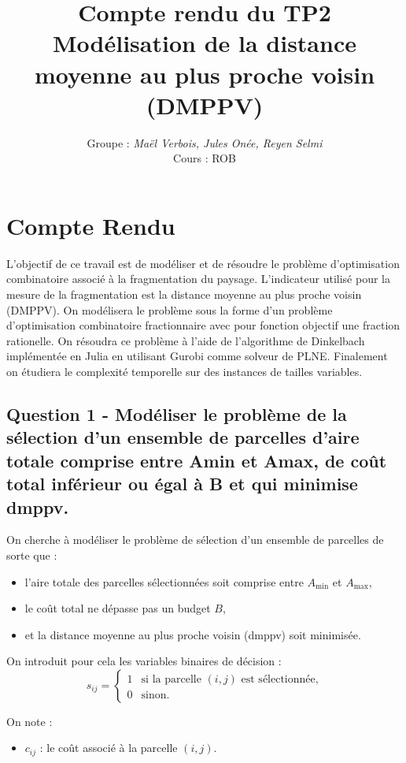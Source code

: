 \documentclass[a4paper,11pt]{article}
\title{\textbf{Compte rendu du TP2}\\[4pt]
\large Modélisation de la distance moyenne au plus proche voisin (DMPPV)}
\author{Groupe : \textit{Maël Verbois, Jules Onée, Reyen Selmi} \\[2pt] Cours : ROB}
\begin{document}
\maketitle


\section{Compte Rendu}
L’objectif de ce travail est de modéliser et de résoudre le problème d'optimisation combinatoire associé à la fragmentation
du paysage. L'indicateur utilisé pour la mesure de la fragmentation est la distance moyenne au plus proche voisin (DMPPV).
On modélisera le problème sous la forme d'un problème d'optimisation combinatoire fractionnaire avec pour fonction objectif une 
fraction rationelle. On résoudra ce problème à l'aide de l'algorithme de Dinkelbach implémentée en Julia en utilisant Gurobi comme solveur de PLNE.
Finalement on étudiera le complexité temporelle sur des instances de tailles variables.


\subsection*{Question 1 -  Modéliser le problème de la sélection d'un ensemble de parcelles d'aire totale comprise
entre Amin et Amax, de coût total inférieur ou égal à B et qui minimise dmppv.
}

On cherche à modéliser le problème de sélection d’un ensemble de parcelles de sorte que :
\begin{itemize}
    \item l’aire totale des parcelles sélectionnées soit comprise entre $A_{\min}$ et $A_{\max}$,
    \item le coût total ne dépasse pas un budget $B$,
    \item et la distance moyenne au plus proche voisin (dmppv) soit minimisée.
\end{itemize}

On introduit pour cela les variables binaires de décision :
\[
s_{ij} =
\begin{cases}
1 & \text{si la parcelle } (i,j) \text{ est sélectionnée,}\\
0 & \text{sinon.}
\end{cases}
\]

On note :
\begin{itemize}
    \item $c_{ij}$ : le coût associé à la parcelle $(i,j)$.
\end{itemize}
\end{document}
